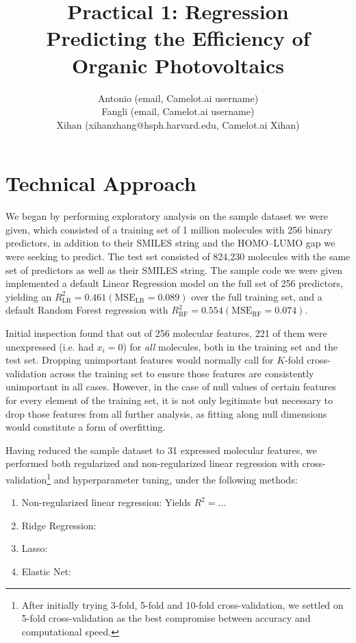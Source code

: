 \documentclass[11pt]{article}
\title{Practical 1: Regression \\ Predicting the Efficiency of Organic Photovoltaics}
\author{Antonio (email, Camelot.ai username) \\
	Fangli (email, Camelot.ai username) \\
	Xihan (xihanzhang@hsph.harvard.edu, Camelot.ai Xihan)}
\begin{document}
\maketitle{}



\section{Technical Approach}

We began by performing exploratory analysis on the sample dataset we were given, which consisted of a training set of 1 million molecules with 256 binary predictors, in addition to their SMILES string and the HOMO--LUMO gap we were seeking to predict. The test set consisted of 824,230 molecules with the same set of predictors as well as their SMILES string. The sample code we were given implemented a default Linear Regression model on the full set of 256 predictors, yielding an $R_\textrm{LR}^2 = 0.461 (\textrm{MSE}_\textrm{LR} = 0.089)$ over the full training set, and a default Random Forest regression with $R_\textrm{RF}^2 = 0.554 (\textrm{MSE}_\textrm{RF} = 0.074)$.

Initial inspection found that out of 256 molecular features, 221 of them were unexpressed (i.e. had $x_i = 0$) for \emph{all} molecules, both in the training set and the test set. Dropping unimportant features would normally call for $K$-fold cross-validation across the training set to ensure those features are consistently unimportant in all cases. However, in the case of null values of certain features for every element of the training set, it is not only legitimate but necessary to drop those features from all further analysis, as fitting along null dimensions would constitute a form of overfitting.

Having reduced the sample dataset to 31 expressed molecular features, we performed both regularized and non-regularized linear regression with cross-validation\footnote{After initially trying 3-fold, 5-fold and 10-fold cross-validation, we settled on 5-fold cross-validation as the best compromise between accuracy and computational speed.} and hyperparameter tuning, under the following methods:

\begin{enumerate}

\item Non-regularized linear regression: Yields $R^2 =  ...$
\item Ridge Regression: 
\item Lasso:
\item Elastic Net:

\end{enumerate}
\end{document}
